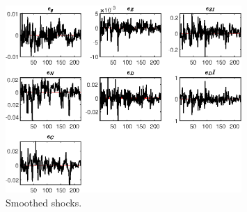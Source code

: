  
\begin{figure}[H]
\centering 
\includegraphics[width=0.80\textwidth]{BRS_growth_util_sectoral/graphs/BRS_growth_util_sectoral_SmoothedShocks1}
\caption{Smoothed shocks.}\label{Fig:SmoothedShocks:1}
\end{figure}


